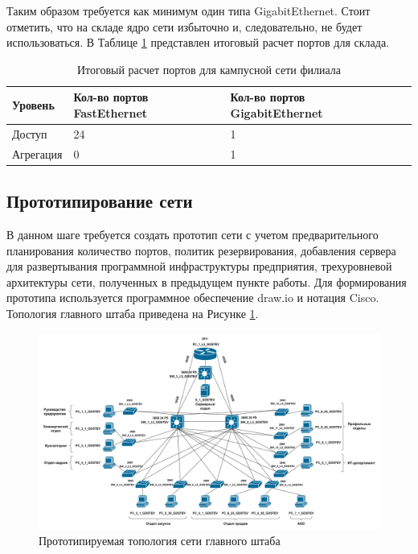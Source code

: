 \documentclass[14pt, a4paper]{extarticle}
\numberwithin{equation}{section}
\begin{document}
Таким образом требуется как минимум один типа GigabitEthernet.
Стоит отметить, что на складе ядро сети избыточно и, 
следовательно, не будет использоваться.
В Таблице \ref{table:warehouseCampusNet} представлен итоговый расчет портов для склада.


\begin{table}[H]
\centering
\small
\caption{Итоговый расчет портов для кампусной сети филиала}
\begin{tabular}{|m{2cm}|m{4cm}|m{3cm}|m{3.5cm}|}
\hline
\textbf{Уровень} & \textbf{Кол-во портов FastEthernet} & \textbf{Кол-во портов GigabitEthernet} \\
\hline
Доступ & 24 & 1 \\
\hline
Агрегация & 0 & 1 \\
\hline
\end{tabular}
\label{table:warehouseCampusNet}
\end{table}

\newpage
\subsection{Прототипирование сети}
В данном шаге требуется создать прототип сети с учетом 
предварительного планирования количество портов, 
политик резервирования, добавления сервера для 
развертывания программной инфраструктуры предприятия, 
трехуровневой архитектуры сети, полученных в предыдущем 
пункте работы. 
Для формирования прототипа используется программное 
обеспечение draw.io и нотация Cisco. Топология главного штаба приведена на Рисунке \ref{fig:mainDepTopo}.


\begin{landscape}
\begin{figure}[H]
        \centering
        \includegraphics[scale=0.2]{topo_mainDep.png}
        \caption{Прототипируемая топология сети главного штаба}
        \label{fig:mainDepTopo}
\end{figure}
\end{landscape}
\end{document}
